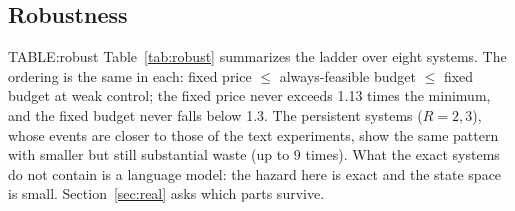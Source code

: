 \subsection{Robustness}
{{TABLE:robust}}
Table~\ref{tab:robust} summarizes the ladder over eight systems. The ordering is the same in each: fixed price $\le$ always-feasible budget $\le$ fixed budget at weak control; the fixed price never exceeds 1.13 times the minimum, and the fixed budget never falls below 1.3. The persistent systems ($R=2,3$), whose events are closer to those of the text experiments, show the same pattern with smaller but still substantial waste (up to 9 times). What the exact systems do not contain is a language model: the hazard here is exact and the state space is small. Section~\ref{sec:real} asks which parts survive.
